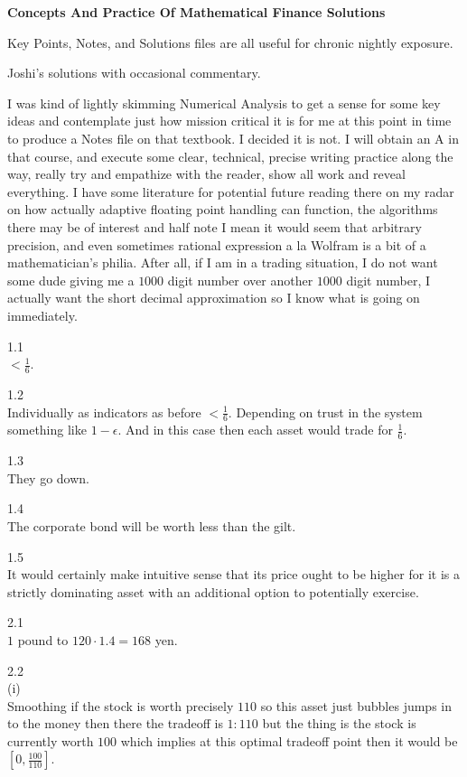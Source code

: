 \Large

\textbf{Concepts And Practice Of Mathematical Finance Solutions}

Key Points, Notes, and Solutions files are all useful for chronic nightly exposure.

Joshi's solutions with occasional commentary.

I was kind of lightly skimming Numerical Analysis to get a sense for some key ideas and contemplate just how mission critical it is for me at this point in time to produce a Notes file on that textbook. I decided it is not. I will obtain an A in that course, and execute some clear, technical, precise writing practice along the way, really try and empathize with the reader, show all work and reveal everything. I have some literature for potential future reading there on my radar on how actually adaptive floating point handling can function, the algorithms there may be of interest and half note I mean it would seem that arbitrary precision, and even sometimes rational expression a la Wolfram is a bit of a mathematician's philia. After all, if I am in a trading situation, I do not want some dude giving me a $1000$ digit number over another $1000$ digit number, I actually want the short decimal approximation so I know what is going on immediately.

1.1 \\
$\boxed{<\frac{1}{6}}$.

1.2 \\
Individually as indicators as before $\boxed{<\frac{1}{6}}$. Depending on trust in the system something like $1-\epsilon$. And in this case then each asset would trade for $\boxed{\frac{1}{6}}$.

1.3 \\
They go down.

1.4 \\
The corporate bond will be worth less than the gilt.

1.5 \\
It would certainly make intuitive sense that its price ought to be higher for it is a strictly dominating asset with an additional option to potentially exercise.

2.1 \\
$1$ pound to $120 \cdot 1.4=168$ yen.

2.2 \\
(i) \\
Smoothing if the stock is worth precisely $110$ so this asset just bubbles jumps in to the money then there the tradeoff is $1:110$ but the thing is the stock is currently worth $100$ which implies at this optimal tradeoff point then it would be $\boxed{\left [ 0,\frac{100}{110} \right ]}$.

